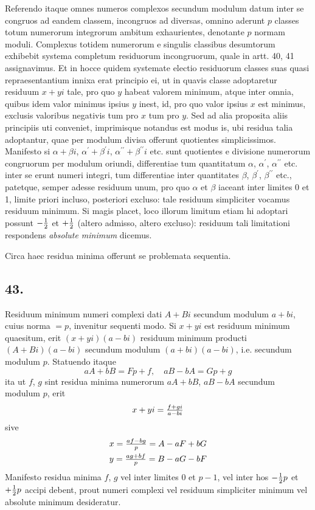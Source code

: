 \documentclass[twoside,12pt]{memoir}
\let\oldfrac\frac
\def\frac#1#2{\mathchoice{\tfrac{#1}{#2}}{\oldfrac{#1}{#2}}{\genfrac{}{}{}{2}{#1}{#2\mathstrut}}{\genfrac{}{}{}{3}{#1}{#2\mathstrut}}}
\begin{document}
Referendo itaque omnes numeros complexos secundum modulum datum inter se congruos ad eandem classem, incongruos ad diversas, omnino aderunt \(p\) classes totum numerorum integrorum ambitum exhaurientes, denotante \(p\) normam moduli. Complexus totidem numerorum e singulis classibus desumtorum exhibebit systema completum residuorum incongruorum, quale in artt. 40, 41 assignavimus. Et in hocce quidem systemate electio residuorum classes suas quasi repraesentantium innixa erat principio ei, ut in quavis classe adoptaretur residuum \(x+y i\) tale, pro quo \(y\) habeat valorem minimum, atque inter omnia, quibus idem valor minimus ipsius \(y\) inest, id, pro quo valor ipsius \(x\) est minimus, exclusis valoribus negativis tum pro \(x\) tum pro \(y\). Sed ad alia proposita aliis principiis uti conveniet, imprimisque notandus est modus is, ubi residua talia adoptantur, quae per modulum divisa offerunt quotientes simplicissimos. Manifesto si \(\alpha+\beta i\), \(\alpha^{\prime}+\beta^{\prime} i\), \(\alpha^{\prime \prime}+\beta^{\prime \prime} i\) etc. sunt quotientes e divisione numerorum congruorum per modulum oriundi, differentiae tum quantitatum \(\alpha\), \(\alpha^{\prime}\), \(\alpha^{\prime \prime}\) etc. inter se erunt numeri integri, tum differentiae inter quantitates \(\beta\), \(\beta^{\prime}\), \(\beta^{\prime \prime}\) etc., patetque, semper adesse residuum unum, pro quo \(\alpha\) et \(\beta\) iaceant inter limites \(0\) et 1, limite priori incluso, posteriori excluso: tale residuum simpliciter vocamus residuum minimum. Si magis placet, loco illorum limitum etiam hi adoptari possunt \(-\frac{1}{2}\) et \(+\frac{1}{2}\) (altero admisso, altero excluso): residuum tali limitationi respondens \textit{absolute minimum} dicemus.
 
Circa haec residua minima offerunt se problemata sequentia.

\subsection*{43.}
 
Residuum minimum numeri complexi dati \(A+B i\) secundum modulum \(a+b i\), cuius norma \(=p\), invenitur sequenti modo. Si \(x+y i\) est residuum minimum quaesitum, erit \((x+y i)(a-b i)\) residuum minimum producti \((A+B i)(a-b i)\) secundum modulum \((a+b i)(a-b i)\), i.e. secundum modulum \(p\). Statuendo itaque
\[a A+b B=F p+f, \quad a B-b A=G p+g\]
ita ut \(f\), \(g\) sint residua minima numerorum \(a A+b B\), \(a B-b A\) secundum modulum \(p\), erit\pagebreak%
\[x+y i=\frac{f+g i}{a-b i}\]
sive
\[\begin{aligned}
& x=\frac{a f-b g}{p}=A-a F+b G \\
& y=\frac{a g+b f}{p}=B-a G-b F
\end{aligned}\]
Manifesto residua minima \(f\), \(g\) vel inter limites \(0\) et \(p-1\), vel inter hos \(-\frac{1}{2} p\) et \(+\frac{1}{2} p\) accipi debent, prout numeri complexi vel residuum simpliciter minimum vel absolute minimum desideratur.
\end{document}
